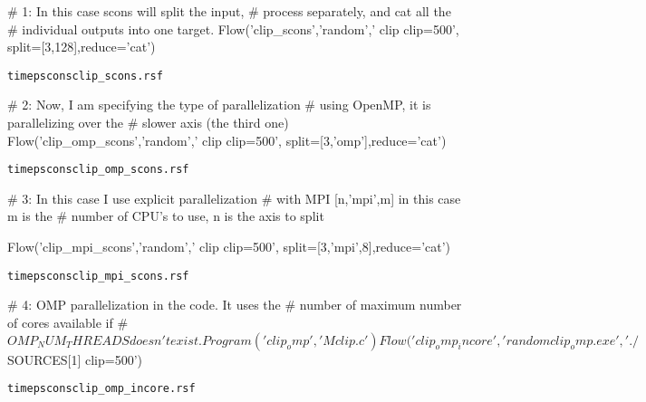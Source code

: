 \begin{frame}[fragile]
\begin{python}
# 1: In this case scons will split the input,
#    process separately, and cat all the 
#    individual outputs into one target.  
Flow('clip_scons','random',' clip clip=500',
      split=[3,128],reduce='cat')
\end{python}

   \begin{alltt}
   time pscons clip_scons.rsf
   \end{alltt}
\end{frame}

\begin{frame}[fragile]
\begin{python}
# 2: Now, I am specifying the type of parallelization
#    using OpenMP, it is parallelizing over the
#    slower axis (the third one) 
Flow('clip_omp_scons','random',' clip clip=500',
    split=[3,'omp'],reduce='cat')
\end{python}

   \begin{alltt}
   time pscons clip_omp_scons.rsf
   \end{alltt}
\end{frame}



\begin{frame}[fragile]
\begin{python}
# 3: In this case I use explicit parallelization 
#    with MPI [n,'mpi',m] in this case m is the
#    number of CPU's to use, n is the axis to split

Flow('clip_mpi_scons','random',' clip clip=500',
    split=[3,'mpi',8],reduce='cat')
\end{python}
   \begin{alltt}
   time pscons clip_mpi_scons.rsf
   \end{alltt}
\end{frame}




\begin{frame}[fragile]
\begin{python}
# 4: OMP parallelization in the code. It uses the
#    number of maximum number of cores available if
#    $OMP_NUM_THREADS doesn't exist.
Program('clip_omp','Mclip.c')
Flow('clip_omp_incore','random clip_omp.exe',
     './${SOURCES[1]} clip=500')
\end{python}
   \begin{alltt}
   time pscons clip_omp_incore.rsf
   \end{alltt}
\end{frame}


